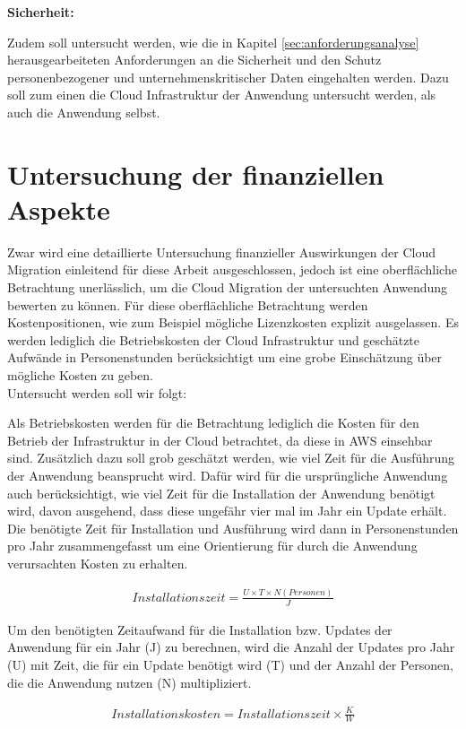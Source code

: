 \textbf{Sicherheit:}

Zudem soll untersucht werden, wie die in Kapitel \ref{sec:anforderungsanalyse} herausgearbeiteten Anforderungen an die Sicherheit und den Schutz personenbezogener und unternehmenskritischer Daten eingehalten werden. Dazu soll zum einen die Cloud Infrastruktur der Anwendung untersucht werden, als auch die Anwendung selbst.

\section{Untersuchung der finanziellen Aspekte}
Zwar wird eine detaillierte Untersuchung finanzieller Auswirkungen der Cloud Migration einleitend für diese Arbeit ausgeschlossen, jedoch ist eine oberflächliche Betrachtung unerlässlich, um die Cloud Migration der untersuchten Anwendung bewerten zu können. Für diese oberflächliche Betrachtung werden Kostenpositionen, wie zum Beispiel mögliche Lizenzkosten explizit ausgelassen. Es werden lediglich die Betriebskosten der Cloud Infrastruktur und geschätzte Aufwände in Personenstunden berücksichtigt um eine grobe Einschätzung über mögliche Kosten zu geben. \\

Untersucht werden soll wir folgt:

Als Betriebskosten werden für die Betrachtung lediglich die Kosten für den Betrieb der Infrastruktur in der Cloud betrachtet, da diese in \ac{AWS} einsehbar sind. Zusätzlich dazu soll grob geschätzt werden, wie viel Zeit für die Ausführung der Anwendung beansprucht wird. Dafür wird für die ursprüngliche Anwendung auch berücksichtigt, wie viel Zeit für die Installation der Anwendung benötigt wird, davon ausgehend, dass diese ungefähr vier mal im Jahr ein Update erhält. Die benötigte Zeit für Installation und Ausführung wird dann in Personenstunden pro Jahr zusammengefasst um eine Orientierung für durch die Anwendung verursachten Kosten zu erhalten.

\begin{align}
    Installationszeit = \frac{U \times T \times N(Personen)}{J}
\end{align}

Um den benötigten Zeitaufwand für die Installation bzw. Updates der Anwendung für ein Jahr (J) zu berechnen, wird die Anzahl der Updates pro Jahr (U) mit Zeit, die für ein Update benötigt wird (T) und der Anzahl der Personen, die die Anwendung nutzen (N) multipliziert.

\begin{align}
    Installationskosten = Installationszeit \times \frac{K}{W}
\end{align}

